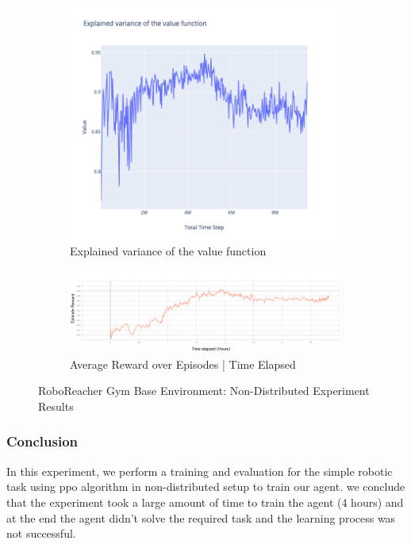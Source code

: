 \begin{figure}[!htb]
    \begin{subfigure}[!htb]{0.35\textwidth}
		\centering
		\includegraphics[width=\textwidth]{figures/exps/1st_exp/vf_explained_var}
		\caption{Explained variance of the value function}
		\label{fig:vf_explained_var}
	\end{subfigure}
	\hfill
	\begin{subfigure}[!htb]{0.35\textwidth}
		\centering
		\includegraphics[width=\textwidth]{figures/exps/1st_exp/avg_reward_time}
		\caption{Average Reward over Episodes | Time Elapsed}
		\label{fig:avg_reward_time}
	\end{subfigure}
	\hfill
    
	   \caption{RoboReacher Gym Base Environment: Non-Distributed Experiment Results}
	   \label{fig:1st_exp_results}
\end{figure}

\subsubsection{Conclusion}

In this experiment, we perform a training and evaluation for the simple robotic task using ppo algorithm in non-distributed setup to train our agent. we conclude that the experiment took a large amount of time to train the agent (4 hours) and at the end the agent didn't solve the required task and the learning process was not successful. 